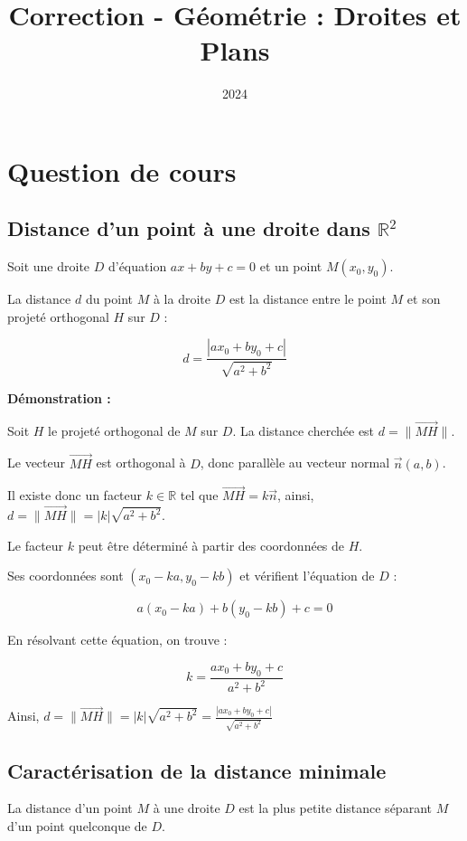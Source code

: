 \documentclass[10pt,a4paper]{article}
\title{Correction - Géométrie : Droites et Plans}
\author{}
\date{2024}
\begin{document}
\maketitle

\section*{Question de cours}

\subsection*{Distance d'un point à une droite dans $\mathbb{R}^2$}

Soit une droite $D$ d'équation $ax + by + c = 0$ et un point $M(x_0, y_0)$.

La distance $d$ du point $M$ à la droite $D$ est la distance entre le point $M$ et son projeté
orthogonal $H$ sur $D$ :

$$ d = \frac{|ax_0 + by_0 + c|}{\sqrt{a^2 + b^2}} $$

\textbf{Démonstration :}

Soit $H$ le projeté orthogonal de $M$ sur $D$. La distance cherchée est $d = \|\vec{MH}\|$.

Le vecteur $\vec{MH}$ est orthogonal à $D$, donc parallèle au vecteur normal $\vec{n}(a,b)$.

Il existe donc un facteur $k \in \mathbb{R}$ tel que $\vec{MH} = k\vec{n}$,
ainsi, $d = \|\vec{MH}\| = |k|\sqrt{a^2 + b^2}$.

Le facteur $k$ peut être déterminé à partir des coordonnées de $H$.

Ses coordonnées sont $(x_0 - ka, y_0 - kb)$ et vérifient l'équation de $D$ :

$$ a(x_0 - ka) + b(y_0 - kb) + c = 0 $$

En résolvant cette équation, on trouve :

$$ k = \frac{ax_0 + by_0 + c}{a^2 + b^2} $$

Ainsi, $d = \|\vec{MH}\| = |k|\sqrt{a^2 + b^2} = \frac{|ax_0 + by_0 + c|}{\sqrt{a^2 + b^2}}$

\subsection*{Caractérisation de la distance minimale}

La distance d'un point $M$ à une droite $D$ est la plus petite distance séparant $M$ d'un point quelconque de $D$.
\end{document}
